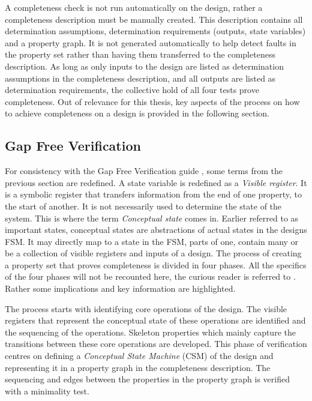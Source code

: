 A completeness check is not run automatically on the design, rather a completeness description must be manually created. This description contains all determination assumptions, determination requirements (outputs, state variables) and a property graph. It is not generated automatically to help detect faults in the property set rather than having them transferred to the completeness description. As long as only inputs to the design are listed as determination assumptions in the completeness description, and all outputs are listed as determination requirements, the collective hold of all four tests prove completeness. Out of relevance for this thesis, key aspects of the process on how to achieve completeness on a design is provided in the following section. 

\subsection{Gap Free Verification}
\label{sub:gfv}
For consistency with the Gap Free Verification guide \cite{gapfree}, some terms from the previous section are redefined. A state variable is redefined as a \textit{Visible register}. It is a symbolic register that transfers information from the end of one property, to the start of another. It is not necessarily used to determine the state of the system. This is where the term \textit{Conceptual state} comes in. Earlier referred to as important states, conceptual states are abstractions of actual states in the designs FSM. It may directly map to a state in the FSM, parts of one,  contain many or be a collection of visible registers and inputs of a design. The process of creating a property set that proves completeness is divided in four phases. All the specifics of the four phases will not be recounted here, the curious reader is referred to \cite{gapfree}. Rather some implications and key information are highlighted. \par
The process starts with identifying core operations of the design. The visible registers that represent the conceptual state of these operations are identified and the sequencing of the operations. Skeleton properties which mainly capture the transitions between these core operations are developed. This phase of verification centres on defining a \textit{Conceptual State Machine} (CSM) of the design and representing it in a property graph in the completeness description. The sequencing and edges between the properties in the property graph is verified with a minimality test. \par
